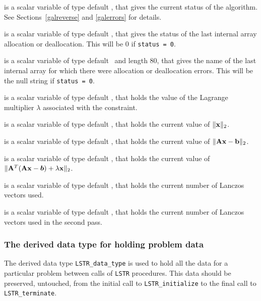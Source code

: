 \documentclass{galahad}
\newcommand{\packagename}{LS\-TR}
\begin{document}
\begin{description}
 is a scalar variable of type default \integer, that gives the 
current status of the algorithm. See Sections~\ref{galreverse} and 
\ref{galerrors} for details. 

 is a scalar variable of type default \integer, 
that gives the status of the last internal array allocation 
or deallocation. This will be 0 if {\tt status = 0}.

 is a scalar variable of type default \character\
and length 80, that  gives the name of the last internal array 
for which there were allocation or deallocation errors.
This will be the null string if {\tt status = 0}. 

 is a scalar variable of type default 
\realdp, that holds the 
value of the Lagrange multiplier $\lambda$ associated with the constraint. 
 
 is a scalar variable of type default \realdp, 
that holds the current value of $\|{\mathbf{x}}\|_2$.
 
 is a scalar variable of type default \realdp, 
that holds the current value of $\|{\mathbf{A}}{\mathbf{x}}-{\mathbf{b}}\|_2$.
 
 is a scalar variable of type default \realdp, 
that holds the current value of 
$\|{\mathbf{A}}^T ( {\mathbf{A}} {\mathbf{x}} - \bm b ) + \lambda {\mathbf{x}} \|_2$.
 
 is a scalar variable of type default \integer, that holds the 
current number of Lanczos vectors used. 
 
 is a scalar variable of type default \integer, that holds the 
current number of Lanczos vectors used in the second pass. 
 
\end{description}


\subsubsection{The derived data type for holding problem data}\label{typedata}
The derived data type 
{\tt \packagename\_data\_type} 
is used to hold all the data for a particular problem between calls of 
{\tt \packagename} procedures. 
This data should be preserved, untouched, from the initial call to 
{\tt \packagename\_initialize}
to the final call to
{\tt \packagename\_terminate}.

\end{document}
